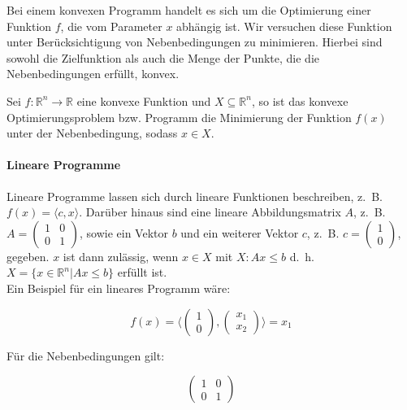 Bei einem konvexen Programm handelt es sich um die Optimierung einer Funktion $f$, die vom Parameter $x$ abhängig ist. Wir versuchen diese Funktion unter Berücksichtigung von Nebenbedingungen zu minimieren. Hierbei sind sowohl die Zielfunktion als auch die Menge der Punkte, die die Nebenbedingungen erfüllt, konvex.

\begin{Def}
Sei $f: \mathbb{R}^{n} \rightarrow \mathbb{R}$ eine konvexe Funktion und $X \subseteq \mathbb{R}^{n}$, so ist das konvexe Optimierungsproblem bzw. Programm die Minimierung der Funktion $f(x)$ unter der Nebenbedingung, sodass $x \in X$.
\end{Def}

\paragraph{Lineare Programme}

Lineare Programme lassen sich durch lineare Funktionen beschreiben, z.~B. $f(x) = \langle c, x \rangle$. Darüber hinaus sind eine lineare Abbildungsmatrix $A$, z.~B. $A = \begin{pmatrix}1 & 0 \\ 0 & 1 \end{pmatrix}$, sowie ein Vektor $b$ und ein weiterer Vektor $c$, z.~B. $c = \begin{pmatrix}1 \\ 0 \end{pmatrix}$, gegeben. $x$ ist dann zulässig, wenn $x \in X$ mit $X: Ax \le b$ d.~h. $X = \{x \in \mathbb{R}^{n} | Ax \le b\}$ erfüllt ist. \\
Ein Beispiel für ein lineares Programm wäre:

\begin{equation*}
f(x) = \langle \begin{pmatrix}1 \\ 0 \end{pmatrix}, \begin{pmatrix}x_{1} \\ x_{2} \end{pmatrix} \rangle = x_{1}
\end{equation*}

Für die Nebenbedingungen gilt:

\begin{equation*}
\begin{pmatrix}1 & 0 \\ 0 & 1 \end{pmatrix}
\end{equation*}

